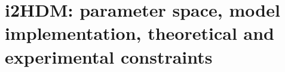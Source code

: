\section{i2HDM: parameter space, model implementation,  theoretical and experimental  constraints}







